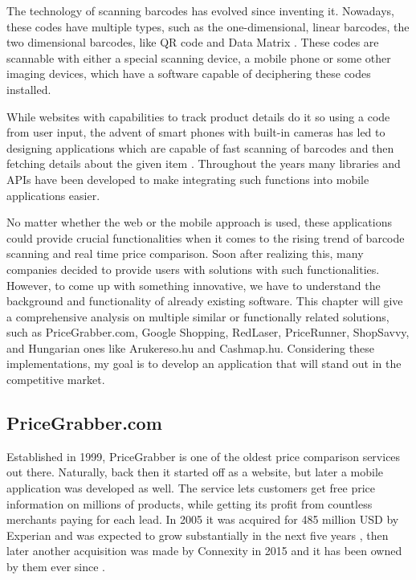 The technology of scanning barcodes has evolved since inventing it. Nowadays, these codes have multiple types, such as the one-dimensional, linear barcodes, the two dimensional barcodes, like QR code and Data Matrix \cite{}. These codes are scannable with either a special scanning device, a mobile phone or some other imaging devices, which have a software capable of deciphering these codes installed.

While websites with capabilities to track product details do it so using a code from user input, the advent of smart phones with built-in cameras has led to designing applications which are capable of fast scanning of barcodes and then fetching details about the given item \cite{}. Throughout the years many libraries and APIs have been developed to make integrating such functions into mobile applications easier.

No matter whether the web or the mobile approach is used, these applications could provide crucial functionalities when it comes to the rising trend of barcode scanning and real time price comparison. Soon after realizing this, many companies decided to provide users with solutions with such functionalities. However, to come up with something innovative, we have to understand the background and functionality of already existing software. This chapter will give a comprehensive analysis on multiple similar or functionally related solutions, such as PriceGrabber.com, Google Shopping, RedLaser, PriceRunner, ShopSavvy, and Hungarian ones like Arukereso.hu and Cashmap.hu. Considering these implementations, my goal is to develop an application that will stand out in the competitive market.

\subsection{PriceGrabber.com}

Established in 1999, PriceGrabber is one of the oldest price comparison services out there. Naturally, back then it started off as a website, but later a mobile application was developed as well. The service lets customers get free price information on millions of products, while getting its profit from countless merchants paying for each lead. In 2005 it was acquired for 485 million USD by Experian and was expected to grow substantially in the next five years \cite{Forbes2005}, then later another acquisition was made by Connexity in 2015 and it has been owned by them ever since \cite{Connexity2015}.

